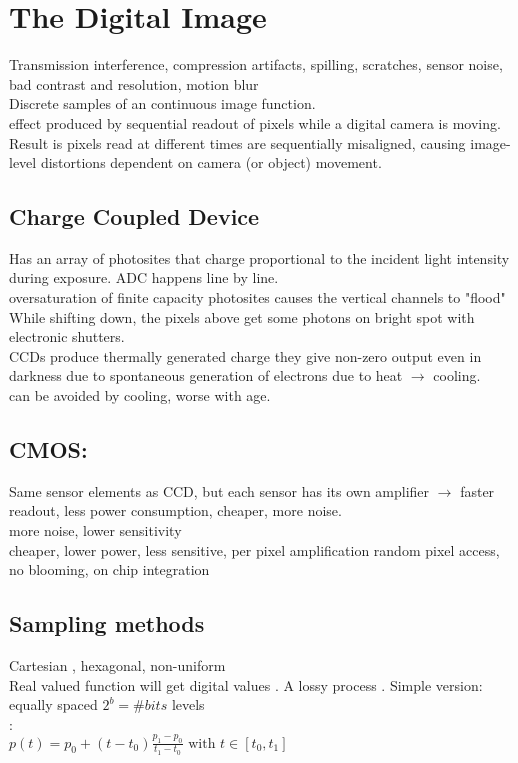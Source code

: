 

\section{The Digital Image}
 Transmission interference, compression artifacts, spilling, scratches, sensor noise, bad contrast and resolution, motion blur \\
 Discrete samples of an continuous image function.\\
 effect produced by sequential readout of pixels while a digital camera is moving. Result is pixels read at different times are sequentially misaligned, causing image-level distortions dependent on camera (or object) movement.
\subsection*{Charge Coupled Device }
Has an array of photosites  that charge proportional to the incident light intensity during exposure. ADC happens line by line. \\
 oversaturation of finite capacity photosites causes the vertical channels to "flood" \\
 While shifting down, the pixels above get some photons on bright spot with electronic shutters.\\
 CCDs produce thermally generated charge they give non-zero output even in darkness  due to spontaneous generation of electrons due to heat $\rightarrow$ cooling.\\ can be avoided by cooling, worse with age.
\subsection*{CMOS:}
Same sensor elements as CCD, but each sensor has its own amplifier $\rightarrow$ faster readout, less power consumption, cheaper, more noise.\\ more noise, lower sensitivity\\
 cheaper, lower power, less sensitive, per pixel amplification random pixel access, no blooming, on chip integration
\subsection*{Sampling methods}
Cartesian , hexagonal, non-uniform\\
 Real valued function will get digital values . A lossy process . Simple version: equally spaced $2^b = \#bits$ levels\\
: \\
$p(t) = p_0 + (t - t_0)\frac{p_1 - p_0}{t_1 - t_0} \text{ with } t \in [t_0, t_1]$ \\

